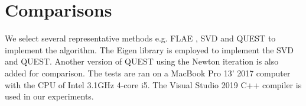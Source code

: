 \documentclass{birkjour}
\numberwithin{equation}{section}
\begin{document}
\section{Comparisons}

We select several representative methods e.g. FLAE \cite{Wu2017}, SVD \cite{Horn1987} and QUEST \cite{Shuster1981} to implement the algorithm. The Eigen library is employed to implement the SVD and QUEST. Another version of QUEST using the Newton iteration is also added for comparison. The tests are ran on a MacBook Pro 13' 2017 computer with the CPU of Intel 3.1GHz 4-core i5. The Visual Studio 2019 C++ compiler is used in our experiments. %

\end{document}
